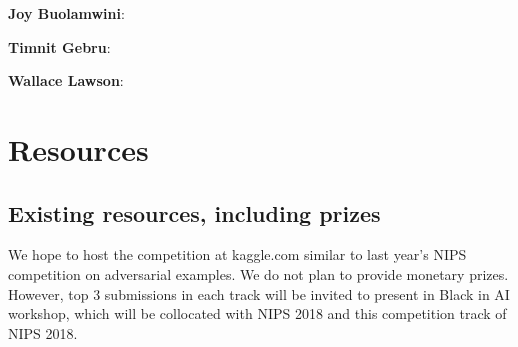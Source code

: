 \documentclass[11pt, oneside]{article}
\begin{document}
{\bf Joy Buolamwini}: 

{\bf Timnit Gebru}:

{\bf Wallace Lawson}:



\section{Resources}
\subsection{Existing resources, including prizes}

We hope to host the competition at kaggle.com similar to last year's NIPS competition on adversarial examples. We do not plan to provide monetary prizes. However, top 3 submissions in each track will be invited to present in Black in AI workshop, which will be collocated with NIPS 2018 and this competition track of NIPS 2018.



%

\end{document}
